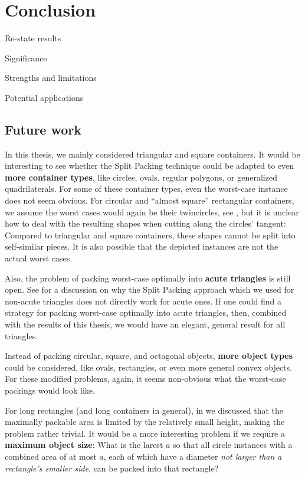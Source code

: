 \documentclass[a4paper,style=print,oneside,bibliography=totoc,nexus,lnum,extramargin]{tubsbook}
\begin{document}
\chapter{Conclusion}\label{ch:conclusions}

Re-state results

Significance

Strengths and limitations

Potential applications

\section{Future work}

In this thesis, we mainly considered triangular and square containers. It would be interesting to see whether the Split Packing technique could be adapted to even \textbf{more container types}, like circles, ovals, regular polygons, or generalized quadrilaterals. For some of these container types, even the worst-case instance does not seem obvious. For circular and “almost square” rectangular containers, we assume the worst cases would again be their twincircles, see , but it is unclear how to deal with the resulting shapes when cutting along the circles' tangent: Compared to triangular and square containers, these shapes cannot be split into self-similar pieces. It is also possible that the depicted instances are not the actual worst cases.


Also, the problem of packing worst-case optimally into \textbf{acute triangles} is still open. See  for a discussion on why the Split Packing approach which we used for non-acute triangles does not directly work for acute ones. If one could find a strategy for packing worst-case optimally into acute triangles, then, combined with the results of this thesis, we would have an elegant, general result for all triangles.

Instead of packing circular, square, and octagonal objects, \textbf{more object types} could be considered, like ovals, rectangles, or even more general convex objects. For these modified problems, again, it seems non-obvious what the worst-case packings would look like.

For long rectangles (and long containers in general), in  we discussed that the maximally packable area is limited by the relatively small height, making the problem rather trivial. It would be a more interesting problem if we require a \textbf{maximum object size}: What is the larest $a$ so that all circle instances with a combined area of at most $a$, each of which have a diameter \emph{not larger than a rectangle's smaller side}, can be packed into that rectangle?
\end{document}

